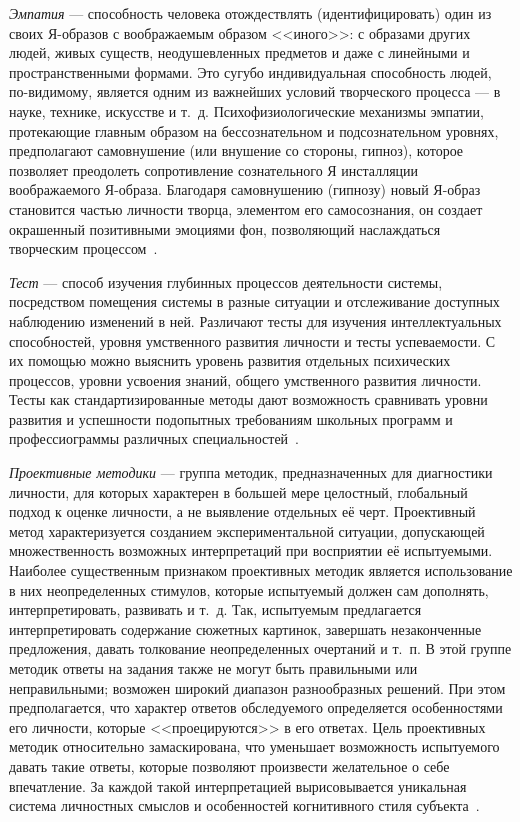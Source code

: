 \emph{Эмпатия} ---  способность человека отождествлять (идентифицировать)
один из своих Я-образов с воображаемым образом <<иного>>: с образами других людей,
живых существ, неодушевленных предметов и даже с линейными и пространственными формами.
Это сугубо индивидуальная способность людей, по-видимому, является одним из важнейших
условий творческого процесса --- в науке, технике, искусстве и т.~д.
Психофизиологические механизмы эмпатии, протекающие главным образом на бессознательном
и подсознательном уровнях, предполагают самовнушение (или внушение со стороны, гипноз),
которое позволяет преодолеть сопротивление сознательного Я инсталляции воображаемого Я-образа.
Благодаря самовнушению (гипнозу) новый Я-образ становится частью личности творца,
элементом его самосознания, он создает окрашенный позитивными эмоциями фон,
позволяющий наслаждаться творческим процессом~\cite{ivin2004}.

\emph{Тест} --- способ изучения глубинных процессов деятельности системы,
посредством помещения системы в разные ситуации и отслеживание доступных
наблюдению изменений в ней. Различают тесты для изучения интеллектуальных способностей,
уровня умственного развития личности и тесты успеваемости.
С их помощью можно выяснить уровень развития отдельных психических процессов,
уровни усвоения знаний, общего умственного развития личности.
Тесты как стандартизированные методы дают возможность сравнивать уровни развития
и успешности подопытных требованиям школьных программ и профессиограммы различных
специальностей~\cite{psyznayka_test}.

\emph{Проективные методики} --- группа методик, предназначенных для диагностики личности,
для которых характерен в большей мере целостный, глобальный подход к оценке личности,
а не выявление отдельных её черт.
Проективный метод характеризуется созданием экспериментальной ситуации,
допускающей множественность возможных интерпретаций при восприятии её испытуемыми.
Наиболее существенным признаком проективных методик является использование в них
неопределенных стимулов, которые испытуемый должен сам дополнять, интерпретировать,
развивать и т.~д. Так, испытуемым предлагается интерпретировать содержание сюжетных картинок,
завершать незаконченные предложения, давать толкование неопределенных очертаний и т.~п.
В этой группе методик ответы на задания также не могут быть правильными или неправильными;
возможен широкий диапазон разнообразных решений.
При этом предполагается, что характер ответов обследуемого определяется особенностями его личности,
которые <<проецируются>> в его ответах.
Цель проективных методик относительно замаскирована, что уменьшает возможность испытуемого
давать такие ответы, которые позволяют произвести желательное о себе впечатление.
За каждой такой интерпретацией вырисовывается уникальная система личностных смыслов
и особенностей когнитивного стиля субъекта~\cite{project_psychology}.

